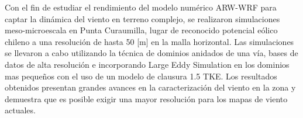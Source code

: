 Con el fin de estudiar el rendimiento del modelo numérico ARW-WRF para captar la dinámica del viento en terreno complejo, se realizaron simulaciones meso-microescala en Punta Curaumilla, lugar de reconocido potencial eólico chileno a una resolución de hasta 50 [m] en la malla horizontal. Las simulaciones se llevaron a cabo utilizando la técnica de dominios anidados de una vía, bases de datos de alta resolución e incorporando Large Eddy Simulation en los dominios mas pequeños con el uso de un modelo de clausura 1.5 TKE. Los resultados obtenidos presentan grandes avances en la caracterización del viento en la zona y demuestra que es posible exigir una mayor resolución para los mapas de viento actuales.